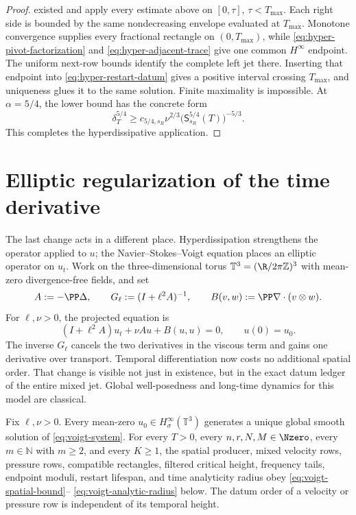 \begin{proof}
existed and apply every estimate above on \([0,\tau]\),
\(\tau<T_{\max}\).  Each right side is bounded by the same nondecreasing
envelope evaluated at \(T_{\max}\).  Monotone convergence supplies every
fractional rectangle on \((0,T_{\max})\), while
\eqref{eq:hyper-pivot-factorization} and
\eqref{eq:hyper-adjacent-trace} give one common \(H^\infty\) endpoint.
The uniform next-row bounds identify the complete left jet there.  Inserting
that endpoint into \eqref{eq:hyper-restart-datum} gives a positive interval
crossing \(T_{\max}\), and uniqueness glues it to the same solution.  Finite
maximality is impossible.  At \(\alpha=5/4\), the lower bound has the
concrete form
\[
 \delta_T^{5/4}
 \ge c_{5/4,s_R}\nu^{2/3}
 \bigl(\mathsf S_{s_R}^{5/4}(T)\bigr)^{-5/3}.
\]
This completes the hyperdissipative application.
\end{proof}

\section{Elliptic regularization of the time derivative}
\label{sec:voigt-application}

The last change acts in a different place.  Hyperdissipation strengthens the
operator applied to \(u\); the Navier--Stokes--Voigt equation places an
elliptic operator on \(u_t\).  Work on the three-dimensional torus
\(\mathbb T^3=(\R/2\pi\mathbb Z)^3\) with mean-zero divergence-free fields,
and set
\begin{equation}
 A:=-\PP\Delta,
 \qquad G_\ell:=(I+\ell^2A)^{-1},
 \qquad B(v,w):=\PP\nabla\cdot(v\otimes w).
 \label{eq:voigt-operators}
\end{equation}
For \(\ell,\nu>0\), the projected equation is
\begin{equation}
 (I+\ell^2A)u_t+\nu Au+B(u,u)=0,
 \qquad u(0)=u_0.
 \label{eq:voigt-system}
\end{equation}
The inverse \(G_\ell\) cancels the two derivatives in the viscous term and
gains one derivative over transport.  Temporal differentiation now costs no
additional spatial order.  That change is visible not just in existence, but
in the exact datum ledger of the entire mixed jet.  Global well-posedness and
long-time dynamics for this model are classical.

\begin{theorem}
\label{thm:quantitative-voigt-jet}
Fix \(\ell,\nu>0\).  Every mean-zero
\(u_0\in H^\infty_\sigma(\mathbb T^3)\) generates a unique global smooth
solution of \eqref{eq:voigt-system}.  For every \(T>0\), every
\(n,r,N,M\in\Nzero\), every \(m\in\mathbb N\) with \(m\ge2\), and every
\(K\ge1\), the spatial
producer, mixed
velocity rows, pressure rows, compatible rectangles, filtered critical
height, frequency tails, endpoint moduli, restart lifespan, and time
analyticity radius obey \eqref{eq:voigt-spatial-bound}--
\eqref{eq:voigt-analytic-radius} below.  The datum order of a velocity or
pressure row is independent of its temporal height.
\end{theorem}

